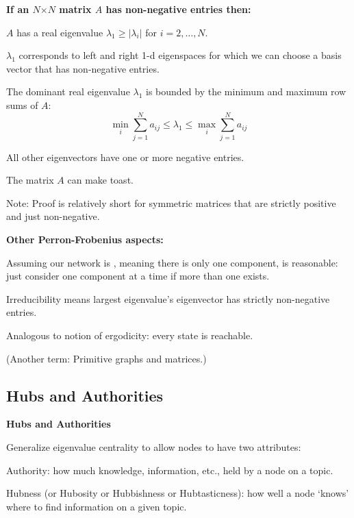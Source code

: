   \textbf{If an $N$$\times$$N$ matrix $A$ has non-negative entries then:}
    
     
      $A$ has a real eigenvalue $\lambda_1 \ge |\lambda_i|$ for $i=2,\ldots,N$.
     
      $\lambda_1$ corresponds to left and right 1-d eigenspaces
      for which we can choose a basis vector that has non-negative entries.
     
      The dominant real eigenvalue $\lambda_1$ is bounded
      by the minimum and maximum row sums of $A$:
      $$
      \min_{i} \sum_{j=1}^{N} a_{ij}
      \le 
      \lambda_1
      \le 
      \max_{i} \sum_{j=1}^{N} a_{ij}
      $$
     
      All other eigenvectors have one or more negative entries.
     
      {
        The matrix $A$ can make toast.
      }
     
      Note: Proof is relatively short for symmetric
      matrices that are strictly positive\cite{ninio1976a}
      and just non-negative\cite{lin1977a}.
    
  


  \textbf{Other Perron-Frobenius aspects:}

  
  
    Assuming our network is 
    ,
    meaning there is only one component, is reasonable:
    {just consider one component at a time if more than
      one exists.}
  
    Irreducibility means largest eigenvalue's eigenvector
    has strictly non-negative entries.
  
    Analogous to notion of ergodicity: every state is reachable.
  
    (Another term: \alert{Primitive} graphs and matrices.)
  



\subsection{Hubs and Authorities}

  \textbf{Hubs and Authorities}

  
   Generalize eigenvalue centrality to 
    allow nodes to have two attributes:
    
     
      \alert{Authority:} 
      how much knowledge, information, etc.,
      held by a node on a topic.
     
      \alert{Hubness (or Hubosity or Hubbishness or Hubtasticness):}
      how well a node `knows' where to find
      information on a given topic.
    
